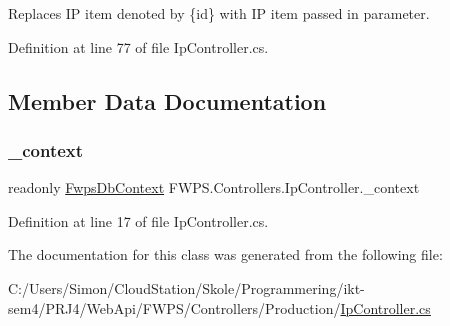 Replaces IP item denoted by \{id\} with IP item passed in parameter. 



Definition at line 77 of file Ip\+Controller.\+cs.



\subsection{Member Data Documentation}
\mbox{\label{class_f_w_p_s_1_1_controllers_1_1_ip_controller_a6b74e68acf41dc1ca73b68ca4b01c097}} 
\subsubsection{\texorpdfstring{\+\_\+context}{\_context}}
{\footnotesize\ttfamily readonly \mbox{\hyperlink{class_f_w_p_s_1_1_data_1_1_fwps_db_context}{Fwps\+Db\+Context}} F\+W\+P\+S.\+Controllers.\+Ip\+Controller.\+\_\+context\hspace{0.3cm}{\ttfamily [private]}}



Definition at line 17 of file Ip\+Controller.\+cs.



The documentation for this class was generated from the following file\+:\begin{DoxyCompactItemize}
\item 
C\+:/\+Users/\+Simon/\+Cloud\+Station/\+Skole/\+Programmering/ikt-\/sem4/\+P\+R\+J4/\+Web\+Api/\+F\+W\+P\+S/\+Controllers/\+Production/\mbox{\hyperlink{_ip_controller_8cs}{Ip\+Controller.\+cs}}\end{DoxyCompactItemize}
